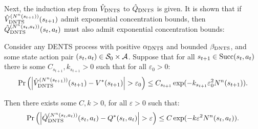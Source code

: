     Next, the induction step from ${\hat{V}_{{\textnormal{DNTS}}}}$ to ${\hat{Q}_{{\textnormal{DNTS}}}}$ is given. It is shown that if ${\hat{V}^{(N^n(s_{t+1}))}_{{\textnormal{DNTS}}}}(s_{t+1})$ admit exponential concentration bounds, then ${\hat{Q}^{(N^n(s_t,a_t))}_{{\textnormal{DNTS}}}}(s_t,a_t)$ must also admit exponential concentration bounds:
    \begin{lemma} \label{lem:stochastic_step}
        Consider any DENTS process with positive ${\alpha_{{\textnormal{DNTS}}}}$ and bounded ${\beta_{{\textnormal{DNTS}}}}$, and some state action pair $(s_t,a_t)\in\mathcal{S}_0\times\mathcal{A}$. Suppose that for all $s_{t+1}\in{\textnormal{Succ}(s_t,a_t)}$ there is some $C_{s_{t+1}}, k_{s_{t+1}}>0$ such that for all $\varepsilon_0 >0$:
        \begin{align}
            \Pr\left(\left| {\hat{V}^{(N^n(s_{t+1}))}_{{\textnormal{DNTS}}}}(s_{t+1}) - V^*(s_{t+1}) \right| > \varepsilon_0 \right) \leq C_{s_{t+1}}\exp(-k_{s_{t+1}}\varepsilon_0^2 N^n(s_{t+1})).
        \end{align}

        Then there exists some $C,k>0$, for all $\varepsilon>0$ such that:
        \begin{align}
            \Pr\left(\left| {\hat{Q}^{(N^n(s_t,a_t))}_{{\textnormal{DNTS}}}}(s_t,a_t) - Q^*(s_t,a_t) \right| > \varepsilon \right) \leq C\exp(-k\varepsilon^2 N^n(s_t,a_t)).
        \end{align}
    \end{lemma}

